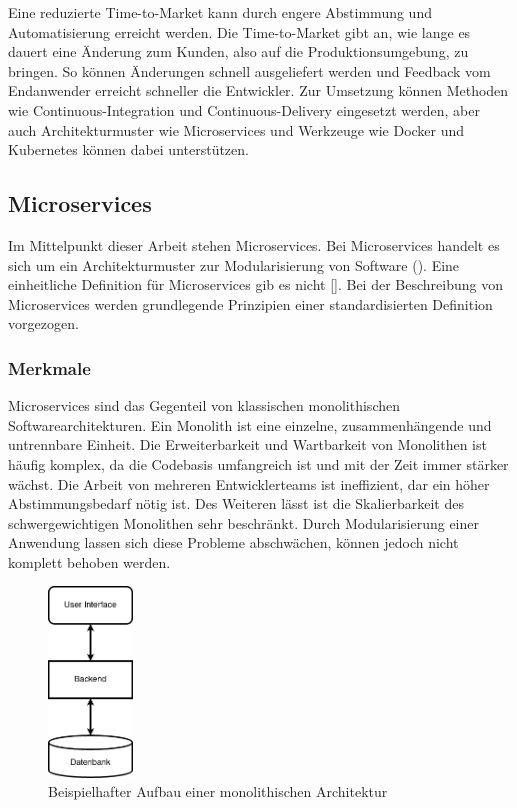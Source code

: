 Eine reduzierte Time-to-Market kann durch engere Abstimmung und Automatisierung erreicht werden. Die Time-to-Market gibt an, wie lange es dauert eine Änderung zum Kunden, also auf die Produktionsumgebung, zu bringen. So können Änderungen schnell ausgeliefert werden und Feedback vom Endanwender erreicht schneller die Entwickler. Zur Umsetzung können Methoden wie Continuous-Integration und Continuous-Delivery eingesetzt werden, aber auch Architekturmuster wie Microservices und Werkzeuge wie Docker und Kubernetes können dabei unterstützen.

\subsection{Microservices}

Im Mittelpunkt dieser Arbeit stehen Microservices. Bei Microservices handelt es sich um ein Architekturmuster zur Modularisierung von Software (\cite[S. 15]{newmanMicroservices2015}). Eine einheitliche Definition für Microservices gib es nicht [\cite[S. 2]{wolffMicroservices2018}]. Bei der Beschreibung von Microservices werden grundlegende Prinzipien einer standardisierten Definition vorgezogen.

\subsubsection{Merkmale}

Microservices sind das Gegenteil von klassischen monolithischen Softwarearchitekturen. Ein Monolith ist eine einzelne, zusammenhängende und untrennbare Einheit. Die Erweiterbarkeit und Wartbarkeit von Monolithen ist häufig komplex, da die Codebasis umfangreich ist und mit der Zeit immer stärker wächst. Die Arbeit von mehreren Entwicklerteams ist ineffizient, dar ein höher Abstimmungsbedarf nötig ist. Des Weiteren lässt ist die Skalierbarkeit des schwergewichtigen Monolithen sehr beschränkt. Durch Modularisierung einer Anwendung lassen sich diese Probleme abschwächen, können jedoch nicht komplett behoben werden.

\begin{figure}[H] 
    \centering
    \includegraphics[width=0.2\textwidth]{figures/Monolith.png}
    \caption{Beispielhafter Aufbau einer monolithischen Architektur}
\end{figure}

